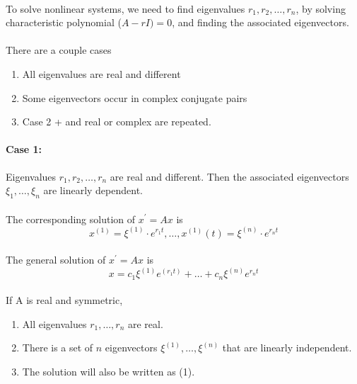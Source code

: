 \documentclass[letterpaper,12pt]{article}
\begin{document}
\paragraph{}To solve nonlinear systems, we need to find eigenvalues $r_1,r_2,\ldots,r_n$, by solving 
characteristic polynomial ($A-rI)=0$, and finding the associated eigenvectors.
\paragraph{}There are a couple cases

\begin{enumerate}
    \item All eigenvalues are real and different
    \item Some eigenvectors occur in complex conjugate pairs
    \item Case 2 + and real or complex are repeated.
\end{enumerate}
\paragraph{Case 1:} Eigenvalues $r_1, r_2, \ldots, r_n$ are real and different. Then the associated
eigenvectors $\xi_1, \ldots, \xi_n$ are linearly dependent.

\paragraph{}The corresponding solution of $x^{\prime}= Ax$ is
\[
    x^{(1)} = \xi^{(1)}\cdot e^{r_1 t},\ldots, x^{(1)}(t) = \xi^{(n)}\cdot e^{r_n t}
\]
\paragraph{}The general solution of $x^{\prime} = Ax$ is
\begin{equation}
    x=c_1\xi^{(1)}e^{(r_1 t)} + \ldots + c_n\xi^{(n)}e^{r_n t}
\end{equation}
\paragraph{}If A is real and symmetric,
\begin{enumerate}
    \item All eigenvalues $r_1, \ldots, r_n$ are real.
    \item There is a set of $n$ eigenvectors $\xi^{(1)},\ldots,\xi^{(n)}$ that are
        linearly independent.

    \item The solution will also be written as (1).
\end{enumerate}
\end{document}
